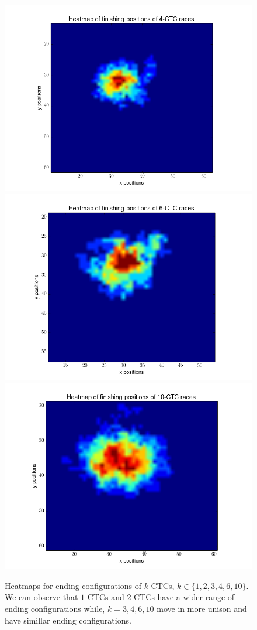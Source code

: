 \documentclass[12pt]{article}
\begin{document}
\begin{figure}[H]
	\includegraphics[scale=0.40]{img/4ctc_heat}
	\includegraphics[scale=0.40]{img/6ctc_heat}
	\includegraphics[scale=0.40]{img/10ctc_heat}
	\caption{Heatmaps for ending configurations of $k$-CTCs, $k\in\{1,2,3,4,6,10\}$. We can observe that $1$-CTCs and $2$-CTCs have a wider range of ending configurations while, $k=3,4,6,10$ move in more unison and have simillar ending configurations.}
	\label{heatmap}
\end{figure}
\end{document}
